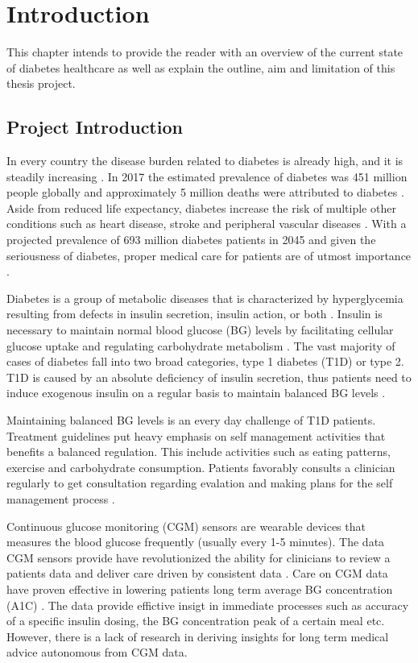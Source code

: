 \chapter{Introduction}

This chapter intends to provide the reader with an overview of the current state of diabetes healthcare as well as explain the outline, aim and limitation of this thesis project.

\section{Project Introduction}

In every country the disease burden related to diabetes is already high, and it is steadily increasing \parencite{Forouhi2014}.
In 2017 the estimated prevalence of diabetes was 451 million people globally and approximately 5 million deaths were attributed to diabetes \parencite{Cho2018}.
Aside from reduced life expectancy, diabetes increase the risk of multiple other conditions such as heart disease, stroke and peripheral vascular diseases \parencite{Forouhi2014}.
With a projected prevalence of 693 million diabetes patients in 2045 and given the seriousness of diabetes, proper medical care for patients are of utmost importance \parencite{Cho2018}.

Diabetes is a group of metabolic diseases that is characterized by hyperglycemia resulting from defects in insulin secretion, insulin action, or both \parencite{ADA2010}.
Insulin is necessary to maintain normal blood glucose (BG) levels by facilitating cellular glucose uptake and regulating carbohydrate metabolism \parencite{Wilcox2005}.
The vast majority of cases of diabetes fall into two broad categories, type 1 diabetes (T1D) or type 2.
T1D is caused by an absolute deficiency of insulin secretion, thus
patients need to induce exogenous insulin on a regular basis to maintain balanced BG levels \parencite{ADA2010}.

Maintaining balanced BG levels is an every day challenge of T1D patients.
Treatment guidelines put heavy emphasis on self management activities that benefits a balanced regulation.
This include activities such as eating patterns, exercise and carbohydrate consumption.
Patients favorably consults a clinician regularly to get consultation regarding evalation and making plans for the self management process \parencite{Cooke2013}.


Continuous glucose monitoring (CGM) sensors are wearable devices that measures the blood glucose frequently (usually every 1-5 minutes).
The data CGM sensors provide have revolutionized the ability for clinicians to review a patients data and deliver care driven by consistent data \parencite{Facchinetti2016}.
Care on CGM data have proven effective in lowering patients long term average BG concentration (A1C) \parencite{dungan2018monitoring}.
The data provide effictive insigt in immediate processes such as accuracy of a specific insulin dosing, the BG concentration peak of a certain meal etc.
However, there is a lack of research in deriving insights for long term medical advice autonomous from CGM data.

